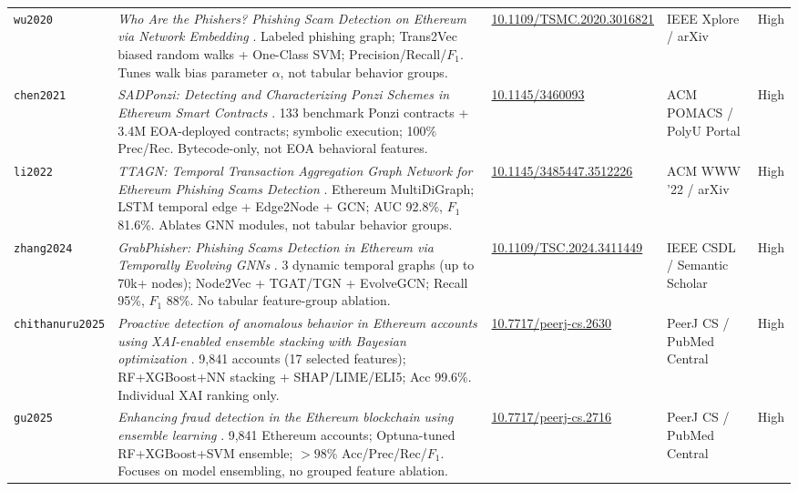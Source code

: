 \documentclass[conference]{IEEEtran}
\begin{document}
\begin{table}[!t]
\begin{tabularx}{\textwidth}{l X l l l}
\addlinespace[3pt]
\texttt{wu2020} & \emph{Who Are the Phishers? Phishing Scam Detection on Ethereum via Network Embedding} \cite{wu2020}. Labeled phishing graph; Trans2Vec biased random walks + One-Class SVM; Precision/Recall/$F_1$. Tunes walk bias parameter $\alpha$, not tabular behavior groups. & \href{https://doi.org/10.1109/TSMC.2020.3016821}{10.1109/TSMC.2020.3016821} & IEEE Xplore / arXiv & High \\
\addlinespace[3pt]
\texttt{chen2021} & \emph{SADPonzi: Detecting and Characterizing Ponzi Schemes in Ethereum Smart Contracts} \cite{chen2021}. 133 benchmark Ponzi contracts + 3.4M EOA-deployed contracts; symbolic execution; 100\% Prec/Rec. Bytecode-only, not EOA behavioral features. & \href{https://doi.org/10.1145/3460093}{10.1145/3460093} & ACM POMACS / PolyU Portal & High \\
\addlinespace[3pt]
\texttt{li2022} & \emph{TTAGN: Temporal Transaction Aggregation Graph Network for Ethereum Phishing Scams Detection} \cite{li2022}. Ethereum MultiDiGraph; LSTM temporal edge + Edge2Node + GCN; AUC 92.8\%, $F_1$ 81.6\%. Ablates GNN modules, not tabular behavior groups. & \href{https://doi.org/10.1145/3485447.3512226}{10.1145/3485447.3512226} & ACM WWW '22 / arXiv & High \\
\addlinespace[3pt]
\texttt{zhang2024} & \emph{GrabPhisher: Phishing Scams Detection in Ethereum via Temporally Evolving GNNs} \cite{zhang2024}. 3 dynamic temporal graphs (up to 70k+ nodes); Node2Vec + TGAT/TGN + EvolveGCN; Recall 95\%, $F_1$ 88\%. No tabular feature-group ablation. & \href{https://doi.org/10.1109/TSC.2024.3411449}{10.1109/TSC.2024.3411449} & IEEE CSDL / Semantic Scholar & High \\
\addlinespace[3pt]
\texttt{chithanuru2025} & \emph{Proactive detection of anomalous behavior in Ethereum accounts using XAI-enabled ensemble stacking with Bayesian optimization} \cite{chithanuru2025}. 9,841 accounts (17 selected features); RF+XGBoost+NN stacking + SHAP/LIME/ELI5; Acc 99.6\%. Individual XAI ranking only. & \href{https://doi.org/10.7717/peerj-cs.2630}{10.7717/peerj-cs.2630} & PeerJ CS / PubMed Central & High \\
\addlinespace[3pt]
\texttt{gu2025} & \emph{Enhancing fraud detection in the Ethereum blockchain using ensemble learning} \cite{gu2025}. 9,841 Ethereum accounts; Optuna-tuned RF+XGBoost+SVM ensemble; $>98\%$ Acc/Prec/Rec/$F_1$. Focuses on model ensembling, no grouped feature ablation. & \href{https://doi.org/10.7717/peerj-cs.2716}{10.7717/peerj-cs.2716} & PeerJ CS / PubMed Central & High \\
\bottomrule
\end{tabularx}
\end{table}
\end{document}

